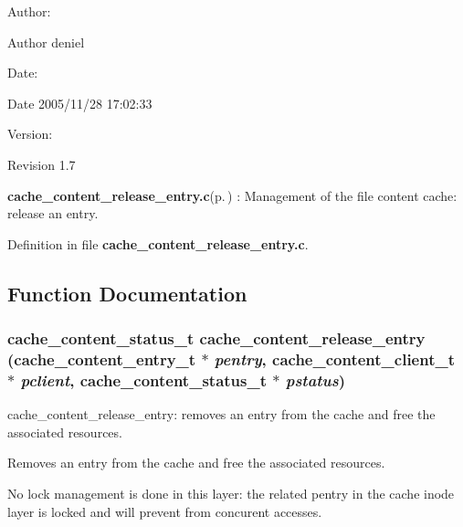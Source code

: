 \begin{Desc}
\item[Author:]\begin{Desc}
\item[Author]deniel \end{Desc}
\end{Desc}
\begin{Desc}
\item[Date:]\begin{Desc}
\item[Date]2005/11/28 17:02:33 \end{Desc}
\end{Desc}
\begin{Desc}
\item[Version:]\begin{Desc}
\item[Revision]1.7 \end{Desc}
\end{Desc}
{\bf cache\_\-content\_\-release\_\-entry.c}{\rm (p.\,\pageref{cache__content__release__entry_8c})} : Management of the file content cache: release an entry.

Definition in file {\bf cache\_\-content\_\-release\_\-entry.c}.

\subsection{Function Documentation}
\subsubsection{\setlength{\rightskip}{0pt plus 5cm}cache\_\-content\_\-status\_\-t cache\_\-content\_\-release\_\-entry (cache\_\-content\_\-entry\_\-t $\ast$ {\em pentry}, cache\_\-content\_\-client\_\-t $\ast$ {\em pclient}, cache\_\-content\_\-status\_\-t $\ast$ {\em pstatus})}\label{cache__content__release__entry_8c_a0}


cache\_\-content\_\-release\_\-entry: removes an entry from the cache and free the associated resources.

Removes an entry from the cache and free the associated resources.

No lock management is done in this layer: the related pentry in the cache inode layer is locked and will prevent from concurent accesses.


